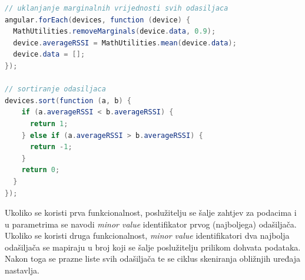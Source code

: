 \begin{lstlisting}[language=java, morekeywords={var,function}]
// uklanjanje marginalnih vrijednosti svih odasiljaca
angular.forEach(devices, function (device) {
  MathUtilities.removeMarginals(device.data, 0.9);
  device.averageRSSI = MathUtilities.mean(device.data);
  device.data = [];
});

// sortiranje odasiljaca
devices.sort(function (a, b) {
    if (a.averageRSSI < b.averageRSSI) {
      return 1;
    } else if (a.averageRSSI > b.averageRSSI) {
      return -1;
    }
    return 0;
  }
});
\end{lstlisting}

Ukoliko se koristi prva funkcionalnost, poslužitelju se šalje zahtjev za podacima i u parametrima se navodi \textit{minor value} identifikator prvog (najboljega) odašiljača. 
Ukoliko se koristi druga funkcionalnost, \textit{minor value} identifikatori dva najbolja odašiljača se mapiraju u broj koji se šalje poslužitelju prilikom dohvata podataka. 
Nakon toga se prazne liste svih odašiljača te se ciklus skeniranja obližnjih uređaja nastavlja.


